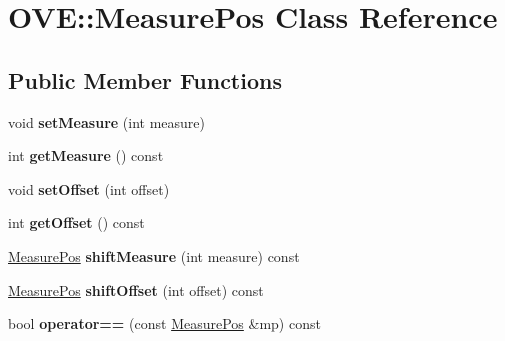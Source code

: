 \hypertarget{class_o_v_e_1_1_measure_pos}{}\section{O\+VE\+:\+:Measure\+Pos Class Reference}
\label{class_o_v_e_1_1_measure_pos}
\subsection*{Public Member Functions}
\begin{DoxyCompactItemize}
\item 
\mbox{\label{class_o_v_e_1_1_measure_pos_ab05972af844552357da6ee9665fee507}} 
void {\bfseries set\+Measure} (int measure)
\item 
\mbox{\label{class_o_v_e_1_1_measure_pos_aaaff333c92409a310c0ca1a709f392c2}} 
int {\bfseries get\+Measure} () const
\item 
\mbox{\label{class_o_v_e_1_1_measure_pos_a3ecf9b35d0d7f3586300e3182b98efca}} 
void {\bfseries set\+Offset} (int offset)
\item 
\mbox{\label{class_o_v_e_1_1_measure_pos_ae579809462284b5b7fd561694ee072b3}} 
int {\bfseries get\+Offset} () const
\item 
\mbox{\label{class_o_v_e_1_1_measure_pos_aea0ac14be165197ed221415701ad4922}} 
\hyperlink{class_o_v_e_1_1_measure_pos}{Measure\+Pos} {\bfseries shift\+Measure} (int measure) const
\item 
\mbox{\label{class_o_v_e_1_1_measure_pos_ade0ce03e15bcb973ab562107ee8f10a8}} 
\hyperlink{class_o_v_e_1_1_measure_pos}{Measure\+Pos} {\bfseries shift\+Offset} (int offset) const
\item 
\mbox{\label{class_o_v_e_1_1_measure_pos_ab04d95f72c16152df711e3b49140ea3d}} 
bool {\bfseries operator==} (const \hyperlink{class_o_v_e_1_1_measure_pos}{Measure\+Pos} \&mp) const
\item 
\mbox{\label{class_o_v_e_1_1_measure_pos_ae5502ff8c5b78d0021e3848e0140f0e3}} 

\end{DoxyCompactItemize}
